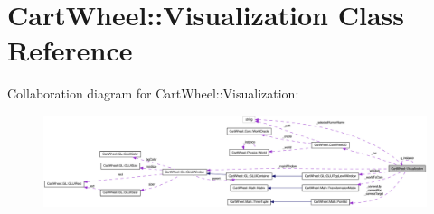 \hypertarget{classCartWheel_1_1Visualization}{
\section{CartWheel::Visualization Class Reference}
\label{classCartWheel_1_1Visualization}
}


Collaboration diagram for CartWheel::Visualization:\nopagebreak
\begin{figure}[H]
\begin{center}
\leavevmode
\includegraphics[width=400pt]{classCartWheel_1_1Visualization__coll__graph}
\end{center}
\end{figure}

